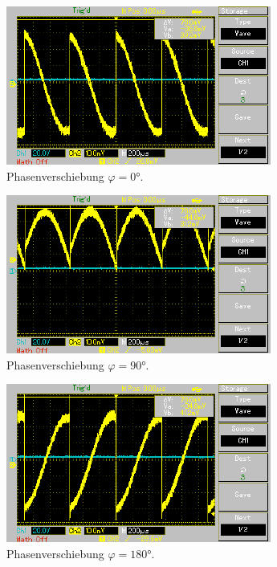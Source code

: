 \begin{figure}
    \begin{subfigure}{0.48\textwidth}
        \centering
        \includegraphics{./content/Oszilloskop_0.pdf}
        \caption{Phasenverschiebung $\varphi = 0°$.}
        \label{fig:0deg}
    \end{subfigure}
    \hfill
    \begin{subfigure}{0.48\textwidth}
        \centering
        \includegraphics{./content/Oszilloskop_90.pdf}
        \caption{Phasenverschiebung $\varphi = 90°$.}
        \label{fig:90deg}
    \end{subfigure}
    \hfill
    \begin{subfigure}{0.48\textwidth}
        \centering
        \includegraphics{./content/Oszilloskop_180.pdf}
        \caption{Phasenverschiebung $\varphi = 180°$.}
        \label{fig:180deg}
    \end{subfigure}
    \hfill
    \begin{subfigure}{0.48\textwidth}

\end{subfigure}
\end{figure}

